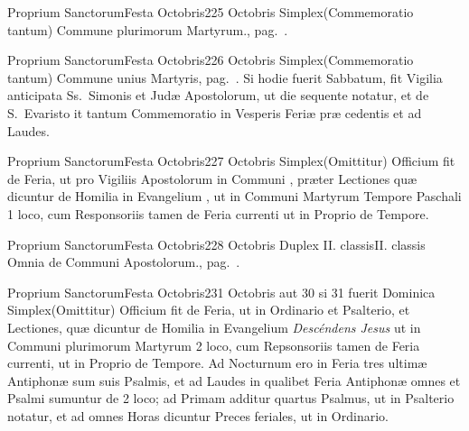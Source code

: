\documentclass[nocturnale-romanum.tex]{subfiles}
\begin{document}
	{Proprium Sanctorum}{Festa Octobris}{2}{25 Octobris}
	{Simplex}{(Commemoratio tantum)}
	{Commune plurimorum Martyrum., pag.\ \pageref{M-PMEX}.}
	{}

	{Proprium Sanctorum}{Festa Octobris}{2}{26 Octobris}
	{Simplex}{(Commemoratio tantum)}
	{Commune unius Martyris, pag.\ \pageref{M-UMEX}. Si hodie fuerit Sabbatum, fit Vigilia anticipata Ss.\ Simonis et Judæ Apostolorum, ut die sequente notatur, et de S.\ Evaristo it tantum Commemoratio in Vesperis Feriæ præ cedentis et ad Laudes.}
	{}

	{Proprium Sanctorum}{Festa Octobris}{2}{27 Octobris}
	{Simplex}{(Omittitur)}
	{Officium fit de Feria, ut pro Vigiliis Apostolorum in Communi \pageref{M-APEX}, præter Lectiones quæ dicuntur de Homilia in Evangelium , ut in Communi Martyrum Tempore Paschali 1 loco, cum Responsoriis tamen de Feria currenti ut in Proprio de Tempore.}
	{}

	{Proprium Sanctorum}{Festa Octobris}{2}{28 Octobris}
	{Duplex II. classis}{II. classis}
	{Omnia de Communi Apostolorum., pag.\ \pageref{M-APEX}.}
	{}

	{Proprium Sanctorum}{Festa Octobris}{2}{31 Octobris aut 30 si 31 fuerit Dominica}
	{Simplex}{(Omittitur)}
	{Officium fit de Feria, ut in Ordinario et Psalterio, et Lectiones, quæ dicuntur de Homilia in Evangelium \emph{Descéndens Jesus} ut in Communi plurimorum Martyrum 2 loco, cum Repsonsoriis tamen de Feria currenti, ut in Proprio de Tempore. Ad Nocturnum ero in Feria  tres ultimæ Antiphonæ sum suis Psalmis, et ad Laudes in qualibet Feria Antiphonæ omnes et Psalmi sumuntur de 2 loco; ad Primam additur quartus Psalmus, ut in Psalterio notatur, et ad omnes Horas dicuntur Preces feriales, ut in Ordinario.}
	{}
\end{document}
